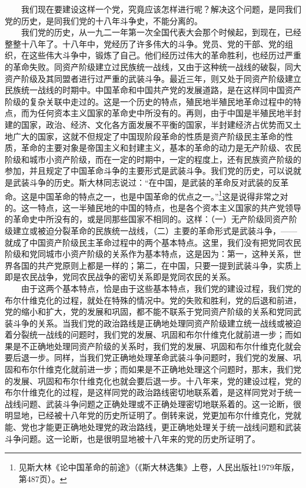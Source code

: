 \documentclass[cn,11pt,chinese]{elegantbook}
\begin{document}
　　我们现在要建设这样一个党，究竟应该怎样进行呢？解决这个问题，是同我们党的历史，是同我们党的十八年斗争史，不能分离的。\\
　　我们党的历史，从一九二一年第一次全国代表大会那个时候起，到现在，已经整整十八年了。十八年中，党经历了许多伟大的斗争。党员、党的干部、党的组织，在这些伟大斗争中，锻炼了自己。他们经历过伟大的革命胜利，也经历过严重的革命失败。同资产阶级建立过民族统一战线，又由于这种统一战线的破裂，同大资产阶级及其同盟者进行过严重的武装斗争。最近三年，则又处于同资产阶级建立民族统一战线的时期中。中国革命和中国共产党的发展道路，是在这样同中国资产阶级的复杂关联中走过的。这是一个历史的特点，殖民地半殖民地革命过程中的特点，而为任何资本主义国家的革命史中所没有的。再则，由于中国是半殖民地半封建的国家，政治、经济、文化各方面发展不平衡的国家，半封建经济占优势而又土地广大的国家，这就不但规定了中国现阶段革命的性质是资产阶级民主革命的性质，革命的主要对象是帝国主义和封建主义，基本的革命的动力是无产阶级、农民阶级和城市小资产阶级，而在一定的时期中，一定的程度上，还有民族资产阶级的参加，并且规定了中国革命斗争的主要形式是武装斗争。我们党的历史，可以说就是武装斗争的历史。斯大林同志说过：“在中国，是武装的革命反对武装的反革命。这是中国革命的特点之一，也是中国革命的优点之一。”\footnote[1]{ 见斯大林《论中国革命的前途》（《斯大林选集》上卷，人民出版社1979年版，第487页）。}这是说得非常之对的。这一特点，这一半殖民地的中国的特点，也是各个资本主义国家的共产党领导的革命史中所没有的，或是同那些国家不相同的。这样：（一）无产阶级同资产阶级建立或被迫分裂革命的民族统一战线，（二）主要的革命形式是武装斗争，——就成了中国资产阶级民主革命过程中的两个基本特点。这里，我们没有把党同农民阶级和党同城市小资产阶级的关系作为基本特点，这是因为：第一，这种关系，世界各国的共产党原则上都是一样的；第二，在中国，只要一提到武装斗争，实质上即是农民战争，党同农民战争的密切关系即是党同农民的关系。\\
　　由于这两个基本特点，恰是由于这些基本特点，我们党的建设过程，我们党的布尔什维克化的过程，就处在特殊的情况中。党的失败和胜利，党的后退和前进，党的缩小和扩大，党的发展和巩固，都不能不联系于党同资产阶级的关系和党同武装斗争的关系。当我们党的政治路线是正确地处理同资产阶级建立统一战线或被迫着分裂统一战线的问题时，我们党的发展、巩固和布尔什维克化就前进一步；而如果是不正确地处理同资产阶级的关系时，我们党的发展、巩固和布尔什维克化就会要后退一步。同样，当我们党正确地处理革命武装斗争问题时，我们党的发展、巩固和布尔什维克化就前进一步；而如果是不正确地处理这个问题时，那末，我们党的发展、巩固和布尔什维克化也就会要后退一步。十八年来，党的建设过程，党的布尔什维克化的过程，是这样同党的政治路线密切地联系着，是这样同党对于统一战线问题、武装斗争问题之正确处理或不正确处理密切地联系着的。这一论断，很明显地，已经被十八年党的历史所证明了。倒转来说，党更加布尔什维克化，党就能、党也才能更正确地处理党的政治路线，更正确地处理关于统一战线问题和武装斗争问题。这一论断，也是很明显地被十八年来的党的历史所证明了。\\
\end{document}
